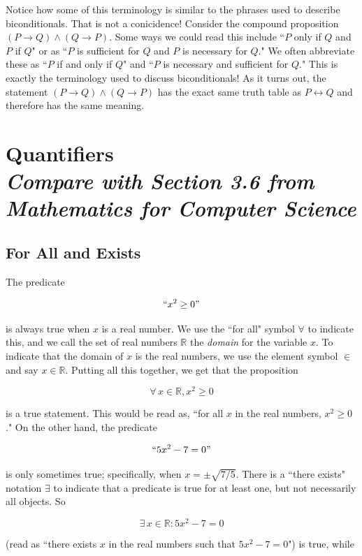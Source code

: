 \documentclass[11pt,oneside]{book}
\theoremstyle{definition}
\begin{document}
Notice how some of this terminology is similar to the phrases used to describe biconditionals.
That is not a conicidence!
Consider the compound proposition $(P \rightarrow Q) \land (Q \rightarrow P)$.
Some ways we could read this include ``$P$ only if $Q$ and $P$ if $Q$" or as ``$P$ is sufficient for $Q$ and $P$ is necessary for $Q$."
We often abbreviate these as ``$P$ if and only if $Q$" and ``$P$ is necessary and sufficient for $Q$."
This is exactly the terminology used to discuss biconditionals!
As it turns out, the statement $(P \rightarrow Q) \land (Q \rightarrow P)$ has the exact same truth table as $P \leftrightarrow Q$ and therefore has the same meaning.



\section[Quantifiers]{Quantifiers\\[0.5ex]
\normalsize\normalfont\textit{
    Compare with Section 3.6 from \emph{Mathematics for Computer Science}
}}
\subsection{For All and Exists}
The predicate

\[ ``x^{2} \geq 0" \]

is always true when $x$ is a real number.
We use the ``for all" symbol $\forall$ to indicate this, and we call the set of real numbers $\mathbb{R}$ the \emph{domain} for the variable $x$.
To indicate that the domain of $x$ is the real numbers, we use the element symbol $\in$ and say $x \in \mathbb{R}$.
Putting all this together, we get that the proposition

\[ \forall\, x \in \mathbb{R}, x^{2} \geq 0 \]

is a true statement.
This would be read as, ``for all $x$ in the real numbers, $x^{2} \geq 0$."
On the other hand, the predicate

\[ ``5x^{2} - 7 = 0" \]

is only sometimes true; specifically, when $x = \pm \sqrt{7/5}$.
There is a ``there exists" notation $\exists$ to indicate that a predicate is true for at least one, but not necessarily all objects.
So

\[ \exists\, x \in \mathbb{R} : 5x^{2} - 7 = 0 \]

(read as ``there exists $x$ in the real numbers such that $5x^{2} - 7 = 0$") is true, while
\end{document}
